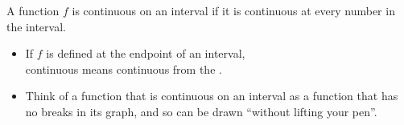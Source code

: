 \begin{frame}
\begin{definition}
A function $f$ is continuous on an interval if it is continuous at every number in the interval.
\end{definition}
\begin{itemize}

\item<2-> If $f$ is defined at the   endpoint of an interval, \\ continuous means continuous from the  . 
\item<4->{
Think of a function that is continuous on an interval as a function that has no breaks in its graph, and so can be drawn ``without lifting your pen''.
}
\end{itemize}


\end{frame}
